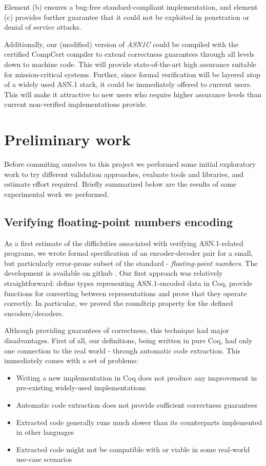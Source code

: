 \documentclass[acmsmall,nonacm]{acmart}
\begin{document}
Element (b) ensures a bug-free standard-compliant implementation, and
element (c) provides further guarantee that it could not be exploited
in penetration or denial of service attacks.

Additionally, our (modified) version of \emph{ASN1C} could be compiled with
the certified CompCert compiler \cite{CompCert} to extend correctness
guarantees through all levels down to machine code. This will provide state-of-the-art high
assurance suitable for mission-critical systems. Further, since formal
verification will be layered atop of a widely used ASN.1 stack, it
could be immediately offered to current users. This will make it attractive to new users who require higher
assurance levels than current non-verified implementations provide.

\section{Preliminary work}

Before commiting ourslves to this project we performed some initial
exploratory work to try different validation approaches, evaluate
tools and libraries, and estimate effort required. Briefly summarized
below are the results of some experimental work we performed.

\subsection{Verifying floating-point numbers encoding}

As a first estimate of the difficluties associated with verifying
ASN.1-related programs, we wrote formal specification of an
encoder-decoder pair for a small, but particularly error-prone subset
of the standard - \textit{floating-point numbers}. The development is
available on github \cite{asn1fpcoq}.  Our first approach was
relatively straightforward: define types representing ASN.1-encoded
data in Coq, provide functions for converting between representations
and prove that they operate correctly. In particular, we proved the
roundtrip property for the defined encoders/decoders.

Although providing guarantees of correctness, this technique had major disadvantages.
First of all, our definitions, being written in pure Coq, had only one
connection to the real world - through automatic code extraction.
This immediately comes with a set of problems:

\begin{itemize}
\item Writing a new implementation in Coq does not produce any improvement in pre-existing widely-used implementations
\item Automatic code extraction does not provide sufficient correctness guarantees
\item Extracted code generally runs much slower than its counterparts implemented in other languages
\item Extracted code might not be compatible with or viable in some real-world use-case scenarios
\end{itemize}
\end{document}
